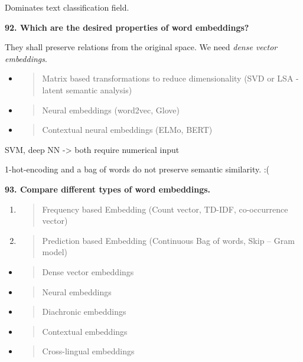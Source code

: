 Dominates text classification field.

\textbf{92. Which are the desired properties of word embeddings?}

They shall preserve relations from the original space. We need
\emph{dense vector embeddings}.

\begin{itemize}
\item
  \begin{quote}
  Matrix based transformations to reduce dimensionality (SVD or LSA -
  latent semantic analysis)
  \end{quote}
\item
  \begin{quote}
  Neural embeddings (word2vec, Glove)
  \end{quote}
\item
  \begin{quote}
  Contextual neural embeddings (ELMo, BERT)
  \end{quote}
\end{itemize}

SVM, deep NN -\textgreater{} both require numerical input

1-hot-encoding and a bag of words do not preserve semantic similarity.
:(

\textbf{93. Compare different types of word embeddings.}

\begin{enumerate}
\def\labelenumi{\arabic{enumi}.}
\item
  \begin{quote}
  Frequency based Embedding (Count vector, TD-IDF, co-occurrence vector)
  \end{quote}
\item
  \begin{quote}
  Prediction based Embedding (Continuous Bag of words, Skip -- Gram
  model)
  \end{quote}
\end{enumerate}

\begin{itemize}
\item
  \begin{quote}
  Dense vector embeddings
  \end{quote}
\item
  \begin{quote}
  Neural embeddings
  \end{quote}
\item
  \begin{quote}
  Diachronic embeddings
  \end{quote}
\item
  \begin{quote}
  Contextual embeddings
  \end{quote}
\item
  \begin{quote}
  Cross-lingual embeddings
  \end{quote}
\end{itemize}

